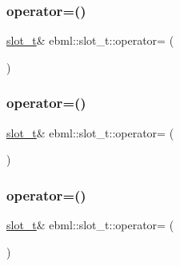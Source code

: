 \subsubsection{\texorpdfstring{operator=()}{operator=()}\hspace{0.1cm}{\footnotesize\ttfamily [3/6]}}
{\footnotesize\ttfamily \mbox{\hyperlink{classebml_1_1slot__t}{slot\+\_\+t}}\& ebml\+::slot\+\_\+t\+::operator= (\begin{DoxyParamCaption}\item[{const \mbox{\hyperlink{namespaceebml_adad533b7705a16bb360fe56380c5e7be}{ebml\+Element\+\_\+sp}} \&}]{ }\end{DoxyParamCaption})}

\mbox{\label{classebml_1_1slot__t_ac3df4ed7828ec3b59cc608aa1be89ff3}} 
\subsubsection{\texorpdfstring{operator=()}{operator=()}\hspace{0.1cm}{\footnotesize\ttfamily [4/6]}}
{\footnotesize\ttfamily \mbox{\hyperlink{classebml_1_1slot__t}{slot\+\_\+t}}\& ebml\+::slot\+\_\+t\+::operator= (\begin{DoxyParamCaption}\item[{\mbox{\hyperlink{namespaceebml_adad533b7705a16bb360fe56380c5e7be}{ebml\+Element\+\_\+sp}} \&\&}]{ }\end{DoxyParamCaption})}

\mbox{\label{classebml_1_1slot__t_a79517bf5358ba5c6f10a051a9073a340}} 
\subsubsection{\texorpdfstring{operator=()}{operator=()}\hspace{0.1cm}{\footnotesize\ttfamily [5/6]}}
{\footnotesize\ttfamily \mbox{\hyperlink{classebml_1_1slot__t}{slot\+\_\+t}}\& ebml\+::slot\+\_\+t\+::operator= (\begin{DoxyParamCaption}\item[{const \mbox{\hyperlink{namespaceebml_a1ddadd26791f273d851882653b9caf70}{ebml\+Element\+\_\+l}} \&}]{ }\end{DoxyParamCaption})}

